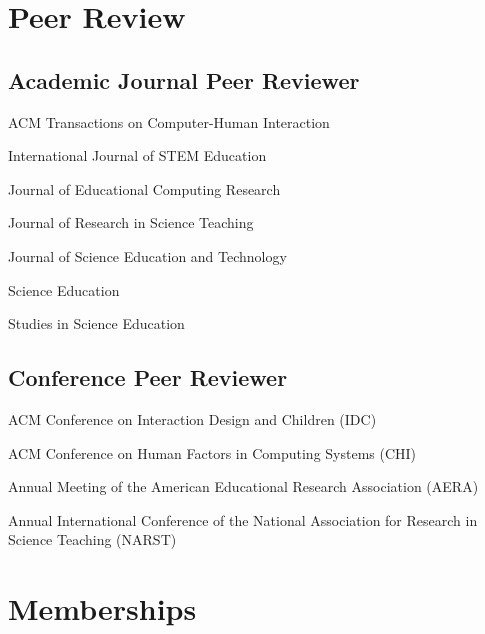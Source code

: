 \documentclass[11pt,letterpaper]{report} %
\newcommand{\listitemspace}{0.25em}
\renewenvironment{itemize}
{\begin{list}{}{\setlength{\leftmargin}{0em}
                \setlength{\parskip}{0em}
                \setlength{\itemsep}{\listitemspace}
                \setlength{\parsep}{\listitemspace}}}
{\end{list}}
\begin{document}

    \section*{Peer Review}

    \subsection*{Academic Journal Peer Reviewer}

    \begin{itemize}

        \item ACM Transactions on Computer-Human Interaction
        \item International Journal of STEM Education
        \item Journal of Educational Computing Research
        \item Journal of Research in Science Teaching
        \item Journal of Science Education and Technology
        \item Science Education
        \item Studies in Science Education

    \end{itemize}


    \subsection*{Conference Peer Reviewer}

    \begin{itemize}

        \item ACM Conference on Interaction Design and Children (IDC)
        \item ACM Conference on Human Factors in Computing Systems (CHI)
        \item Annual Meeting of the American Educational Research Association (AERA)%
        \item Annual International Conference of the National Association for Research in Science Teaching (NARST)

    \end{itemize}



    \section*{Memberships}
\end{document}
